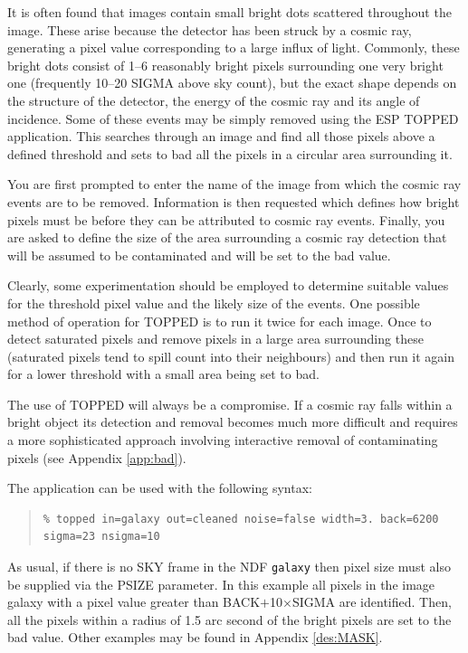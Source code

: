 \documentclass[twoside,11pt]{article}
\newenvironment{myquote}{\begin{quote}\begin{small}}{\end{small}\end{quote}}
\begin{document}
It is often found that images contain small bright dots scattered throughout 
the image. These arise because the detector has been struck by a cosmic ray, 
generating a pixel value corresponding to a large influx of light. Commonly, 
these bright dots consist of 1--6 reasonably bright pixels surrounding one 
very bright one (frequently 10--20 SIGMA above sky count), but 
the exact shape depends on the structure of the detector, the energy of 
the cosmic ray and its angle of incidence. Some of these events may be 
simply removed using the ESP TOPPED application. This searches 
through an image and find all those pixels above a defined threshold and 
sets to bad all the pixels in a circular area surrounding it. 

You are first
prompted to enter the name of the image from which the cosmic ray events are 
to be removed. Information is then requested which defines how bright pixels 
must be before they can be attributed to cosmic ray events. Finally, you are
asked to define 
the size of the area surrounding a cosmic ray detection that will be 
assumed to be contaminated and will be set to the bad value. 

Clearly, some experimentation should be employed to determine 
suitable values for the threshold pixel value and the likely size of the 
events. One possible method of operation for TOPPED is to run it twice for 
each image. Once to detect saturated pixels and remove pixels in a 
large area surrounding these (saturated pixels tend to spill count into 
their neighbours) and then run it again for a lower threshold with a small area
being set to bad. 

The use of TOPPED will always be a compromise. If a cosmic ray falls 
within a bright object its detection and removal becomes much more 
difficult and requires a more sophisticated approach involving 
interactive removal of contaminating pixels (see Appendix \ref{app:bad}). 

The application can be used with the following syntax:

\begin{myquote}
\begin{verbatim}
% topped in=galaxy out=cleaned noise=false width=3. back=6200 sigma=23 nsigma=10
\end{verbatim}
\end{myquote}

As usual, if there is no SKY frame in the NDF {\tt galaxy}
then pixel size must also be supplied via the PSIZE parameter.
In this example all pixels in the image galaxy with a pixel value 
greater than BACK$+$10$\times$SIGMA are identified. Then, all the pixels 
within a radius of 1.5 arc second of the bright pixels are set to the 
bad value. Other examples may be found in Appendix \ref{des:MASK}.
\end{document}
